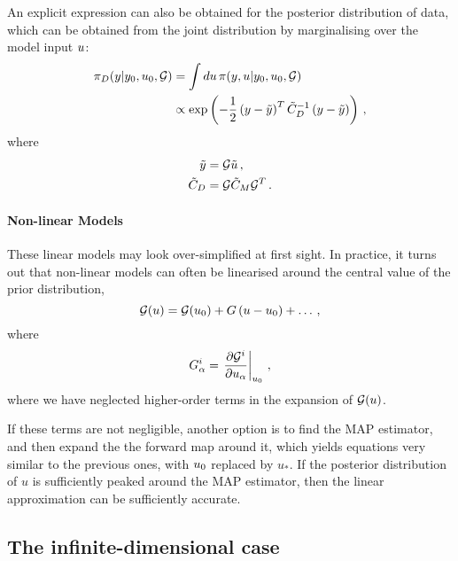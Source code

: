 An explicit expression can also be obtained for the posterior distribution of
data, which can be obtained from the joint distribution by marginalising over
the model input $u$:
\begin{align}\label{eq:PosteriorDataSpace}
  \pi_D(y|y_0,u_0,\mathcal{G})
  &= \int du\, \pi(y,u|y_0,u_0,\mathcal{G}) \\
  &\propto \exp\left(
    -\frac12 \left(y - \tilde{y}\right)^T \tilde{C}_D^{-1}
    \left(y - \tilde{y}\right)
  \right)\, ,
\end{align}
where
\begin{align}\label{eq:PosteriorDataParams}
  \tilde{y} &= \mathcal{G} \tilde{u}\, , \\
  \tilde{C}_D &= \mathcal{G} \tilde{C}_M \mathcal{G}^T\, .
\end{align}

\paragraph{Non-linear Models}

These linear models may look over-simplified at first sight. In practice, it
turns out that non-linear models can often be linearised around the central
value of the prior distribution, 
\begin{equation}
  \label{eq:LinU0}
  \mathcal{G}(u) = \mathcal{G}(u_0) + G \left(u - u_0\right) + \ldots\, ,
\end{equation}
where 
\begin{equation}
  \label{eq:FirstDerU0}
  G^i_\alpha = \left. \frac{\partial \mathcal{G}^i}{\partial u_\alpha} \right|_{u_0}\, ,
\end{equation}
where we have neglected higher-order terms in the expansion of $\mathcal{G}(u)$.

If these terms are not negligible, another option is to find the MAP estimator,
and then expand the the forward map around it, which yields equations very
similar to the previous ones, with $u_0$ replaced by $u_*$. If the
posterior distribution of $u$ is sufficiently peaked around the
MAP estimator, then the linear approximation can be sufficiently accurate. 


\subsection{The infinite-dimensional case}
\label{sec:infin-dimens-case}

